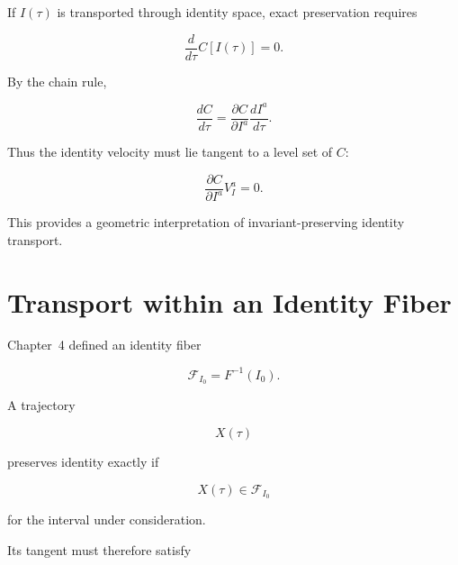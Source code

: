 \documentclass[12pt,oneside]{book}
\begin{document}
If \(I(\tau)\) is transported through identity space, exact
preservation requires

\begin{equation}
    \frac{d}{d\tau}
    C[I(\tau)]
    =
    0.
    \label{eq:transport-invariant-derivative}
\end{equation}

By the chain rule,

\begin{equation}
    \frac{dC}{d\tau}
    =
    \frac{\partial C}{\partial I^a}
    \frac{dI^a}{d\tau}.
    \label{eq:identity-invariant-chain-rule}
\end{equation}

Thus the identity velocity must lie tangent to a level set of
\(C\):

\begin{equation}
    \frac{\partial C}{\partial I^a}
    V_I^a
    =
    0.
    \label{eq:identity-tangent-level-set}
\end{equation}

This provides a geometric interpretation of invariant-preserving
identity transport.


\section{Transport within an Identity Fiber}
\label{sec:transport-identity-fiber}

Chapter~4 defined an identity fiber

\begin{equation}
    \mathcal{F}_{I_0}
    =
    F^{-1}(I_0).
\end{equation}

A trajectory

\begin{equation}
    X(\tau)
\end{equation}

preserves identity exactly if

\begin{equation}
    X(\tau)
    \in
    \mathcal{F}_{I_0}
\end{equation}

for the interval under consideration.

Its tangent must therefore satisfy
\end{document}
